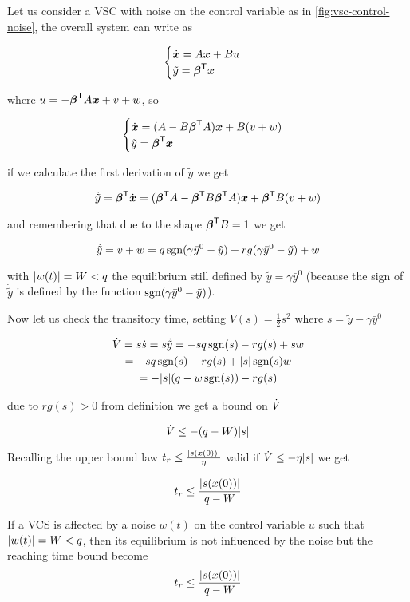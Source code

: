 Let us consider a VSC with noise on the control variable as in \cref{fig:vsc-control-noise}, the overall system can write as

\[
    \begin{cases}
        \dot{\boldsymbol{x}} = A\boldsymbol{x} + B u \\
        \tilde y = \boldsymbol{\beta}^{\mathsf{T}} \boldsymbol{x}
    \end{cases}
\]

where $u = - \boldsymbol{\beta}^{\mathsf{T}} A \boldsymbol{x} + v + w$, so

\[
    \begin{cases}
        \dot{\boldsymbol{x}} = (A - B\boldsymbol{\beta}^{\mathsf{T}} A)\boldsymbol{x} + B (v + w) \\
        \tilde y = \boldsymbol{\beta}^{\mathsf{T}} \boldsymbol{x}
    \end{cases}
\]

if we calculate the first derivation of $\tilde y$ we get

\[
    \dot{\tilde y} = \boldsymbol{\beta}^{\mathsf{T}} \dot{\boldsymbol{x}} =  (\boldsymbol{\beta}^{\mathsf{T}} A - \boldsymbol{\beta}^{\mathsf{T}} B\boldsymbol{\beta}^{\mathsf{T}} A)\boldsymbol{x} + \boldsymbol{\beta}^{\mathsf{T}} B (v + w)
\]

and remembering that due to the shape $\boldsymbol{\beta}^{\mathsf{T}} B = 1$ we get

\[
    \dot{\tilde y} = v + w = q \operatorname{sgn}(\gamma\bar y^0 - \tilde y) + r g(\gamma\bar y^0 - \tilde y) + w
\]

with $\lvert w(t)\rvert = W < q$ the equilibrium still defined by $\tilde y=\gamma \bar y^0$ (because the sign of $\dot{\tilde y}$ is defined by the function $\operatorname{sgn}(\gamma \bar y^0 - \tilde y)$).

Now let us check the transitory time, setting $V(s) = \frac{1}{2}s^2$ where $s = \tilde y - \gamma \bar y^0$

\begin{multline*}
    \dot{V} = s\dot s = s \dot{\tilde y}
    = - s q \operatorname{sgn}(s) - r g(s) + s w \\
    = - s q \operatorname{sgn}(s) - r g(s) + \lvert s\rvert \operatorname{sgn}(s) w \\
    = - \lvert s\rvert (q - w \operatorname{sgn}(s)) - r g(s)
\end{multline*}

due to $r g(s) > 0$ from definition we get a bound on $\dot{V}$

\[
    \dot{V} \leq -(q-W) \lvert s\rvert
\]

Recalling the upper bound law $t_r \leq \frac{\lvert s(x(0))\rvert}{\eta}$ valid if $\dot{V} \leq - \eta \lvert s\rvert$ we get

\[
    t_r \leq \frac{\lvert s(x(0))\rvert}{q-W}
\]

\begin{theorem}
    If a VCS is affected by a noise $w(t)$ on the control variable $u$ such that $\lvert w(t)\rvert = W < q$, then its equilibrium is not influenced by the noise but the reaching time bound become
    \[
        t_r \leq \frac{\lvert s(x(0))\rvert}{q-W}
    \]
\end{theorem}

